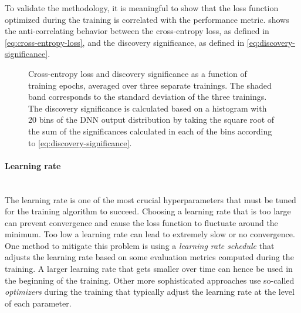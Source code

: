 To validate the methodology, it is meaningful to show that the loss function optimized during the training is correlated with the performance metric. 
 shows the anti-correlating behavior between the cross-entropy loss, as defined in \cref{eq:cross-entropy-loss}, and the discovery significance, as defined in \cref{eq:discovery-significance}.

\begin{figure}[t]
    \caption{Cross-entropy loss and discovery significance as a function of training epochs, averaged over three separate trainings. The shaded band corresponds to the standard deviation of the three trainings. The discovery significance is calculated based on a histogram with 20 bins of the DNN output distribution by taking the square root of the sum of the significances calculated in each of the bins according to \cref{eq:discovery-significance}.}
    \label{fig:loss-vs-sign}
\end{figure}



\paragraph{Learning rate} \mbox{}\\
The learning rate is one of the most crucial hyperparameters that must be tuned for the training algorithm to succeed. Choosing a learning rate that is too large can prevent convergence and cause the loss function to fluctuate around the minimum. Too low a learning rate can lead to extremely slow or no convergence. 
One method to mitigate this problem is using a \emph{learning rate schedule} that adjusts the learning rate based on some evaluation metrics computed during the training. A larger learning rate that gets smaller over time can hence be used in the beginning of the training. 
Other more sophisticated approaches use so-called \emph{optimizers} during the training that typically adjust the learning rate at the level of each parameter.

